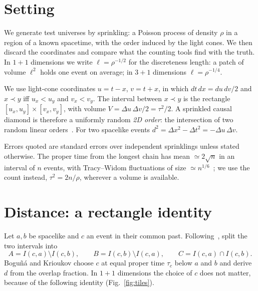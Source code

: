\documentclass[11pt,a4paper]{article}
\begin{document}
\section{Setting}\label{sec:setting}
We generate test universes by sprinkling: a Poisson process of density $\rho$ in a region of a known spacetime, with the order induced by the light cones. We then discard the coordinates and compare what the counting tools find with the truth. In $1+1$ dimensions we write $\ell=\rho^{-1/2}$ for the discreteness length: a patch of volume $\ell^2$ holds one event on average; in $3+1$ dimensions $\ell=\rho^{-1/4}$.

We use light-cone coordinates $u=t-x$, $v=t+x$, in which $dt\,dx=du\,dv/2$ and $x\prec y$ iff $u_x<u_y$ and $v_x<v_y$. The interval between $x\prec y$ is the rectangle $[u_x,u_y]\times[v_x,v_y]$, with volume $V=\Delta u\,\Delta v/2=\tau^2/2$. A sprinkled causal diamond is therefore a uniformly random \emph{2D order}: the intersection of two random linear orders~\cite{BHS08,Surya12}. For two spacelike events $d^2=\Delta x^2-\Delta t^2=-\Delta u\,\Delta v$.

Errors quoted are standard errors over independent sprinklings unless stated otherwise. The proper time from the longest chain has mean $\simeq2\sqrt n$ in an interval of $n$ events, with Tracy--Widom fluctuations of size $\simeq n^{1/6}$~\cite{BDJ99}; we use the count instead, $\tau^2=2n/\rho$, wherever a volume is available.

\section{Distance: a rectangle identity}\label{sec:dist}
Let $a,b$ be spacelike and $c$ an event in their common past. Following~\cite{BK24}, split the two intervals into
\begin{equation}
A=I(c,a)\setminus I(c,b),\qquad B=I(c,b)\setminus I(c,a),\qquad C=I(c,a)\cap I(c,b).
\end{equation}
Bogu\~n\'a and Krioukov choose $c$ at equal proper time $\tau_c$ below $a$ and $b$ and derive $d$ from the overlap fraction. In $1+1$ dimensions the choice of $c$ does not matter, because of the following identity (Fig.~\ref{fig:tiles}).
\end{document}
